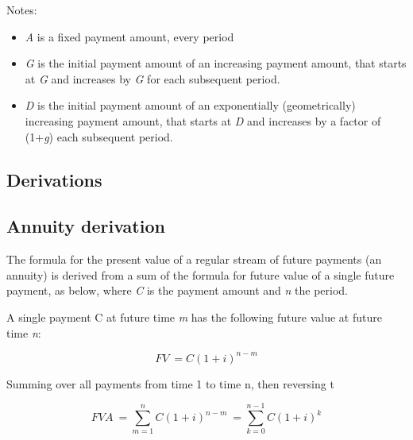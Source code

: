 Notes:



\begin{itemize}
    \item \textit{A} is a fixed payment amount, every period
    \item \textit{G} is the initial payment amount of an increasing payment amount, that starts at \textit{G} and increases by \textit{G} for each subsequent period.
    \item \textit{D} is the initial payment amount of an exponentially (geometrically) increasing payment amount, that starts at \textit{D} and increases by a factor of (1+\textit{g}) each subsequent period.
\end{itemize}


\subsection{Derivations}
\label{sss:deri-9346}





\subsection{Annuity derivation}
\label{sss:annu-5d75}




The formula for the present value of a regular stream of future payments (an annuity) is
derived from a sum of the formula for future value of a single future payment, as below,
where \textit{C} is the payment amount and \textit{n} the period.



A single payment C at future time \textit{m} has the following future value at future time
\textit{n}:



$$FV \ = C(1+i)^{n-m}$$



Summing over all payments from time 1 to time n, then reversing t



$$FVA \ = \sum _{m=1}^n C(1+i)^{n-m} \ = \sum _{k=0}^{n-1} C(1+i)^k$$



